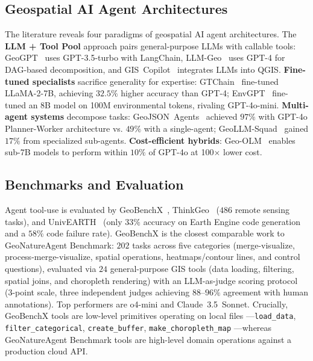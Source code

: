 \documentclass[sigconf]{acmart}
\begin{document}
\subsection{Geospatial AI Agent Architectures}

The literature reveals four paradigms of geospatial AI agent architectures. The \textbf{LLM + Tool Pool} approach pairs general-purpose LLMs with callable tools: GeoGPT~\citep{zhang2023geogpt} uses GPT-3.5-turbo with LangChain, LLM-Geo~\citep{li2023llmgeo} uses GPT-4 for DAG-based decomposition, and GIS~Copilot~\citep{akinboyewa2024giscopilot} integrates LLMs into QGIS. \textbf{Fine-tuned specialists} sacrifice generality for expertise: GTChain~\citep{zhang2024gtchain} fine-tuned LLaMA-2-7B, achieving $32.5\%$ higher accuracy than GPT-4; EnvGPT~\citep{zhang2025envgpt} fine-tuned an 8B model on 100M environmental tokens, rivaling GPT-4o-mini. \textbf{Multi-agent systems} decompose tasks: GeoJSON~Agents~\citep{luo2025geojsonagents} achieved $97\%$ with GPT-4o Planner-Worker architecture vs. $49\%$ with a single-agent; GeoLLM-Squad~\citep{lee2025geollmsquad} gained $17\%$ from specialized sub-agents. \textbf{Cost-efficient hybrids}: Geo-OLM~\citep{stamoulis2025geoolm} enables sub-7B models to perform within $10\%$ of GPT-4o at 100$\times$ lower cost.


\subsection{Benchmarks and Evaluation}

Agent tool-use is evaluated by GeoBenchX~\citep{krechetova2025geobenchx}, ThinkGeo~\citep{shabbir2025thinkgeo} ($486$ remote sensing tasks), and UnivEARTH~\citep{kao2025univearth} (only $33\%$ accuracy on Earth Engine code generation and a $58\%$ code failure rate). GeoBenchX is the closest comparable work to GeoNatureAgent Benchmark: $202$ tasks across five categories (merge-visualize, process-merge-visualize, spatial operations, heatmaps/contour lines, and control questions), evaluated via $24$ general-purpose GIS tools (data loading, filtering, spatial joins, and choropleth rendering) with an LLM-as-judge scoring protocol (3-point scale, three independent judges achieving $88$--$96\%$ agreement with human annotations). Top performers are o4-mini and Claude~3.5~Sonnet. Crucially, GeoBenchX tools are low-level primitives operating on local files ---\texttt{load\_data}, \texttt{filter\_categorical}, \texttt{create\_buffer}, \texttt{make\_\allowbreak choropleth\_\allowbreak map} ---whereas GeoNatureAgent Benchmark tools are high-level domain operations against a production cloud API.
\end{document}
